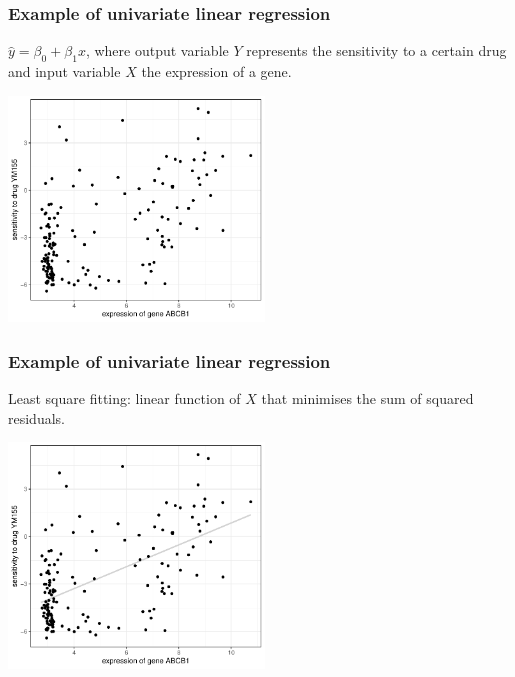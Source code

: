 \documentclass[notes]{beamer}          %
\begin{document}
\begin{frame}
\frametitle{Example of univariate linear regression}
$\hat{y} = \beta_0 + \beta_1 x$, where output variable $Y$ represents the sensitivity to a certain drug and input variable $X$ the expression of a gene.

\begin{center}
\includegraphics[height=6cm]{../figures/week_2_linear_models/Univariate_linear_regression_0.pdf}
\end{center}

\end{frame}

\begin{frame}
\frametitle{Example of univariate linear regression}
Least square fitting: linear function of $X$ that minimises the sum of squared residuals.

\begin{center}
\includegraphics[height=6cm]{../figures/week_2_linear_models/Univariate_linear_regression_1.pdf}
\end{center}

\end{frame}
\end{document}
